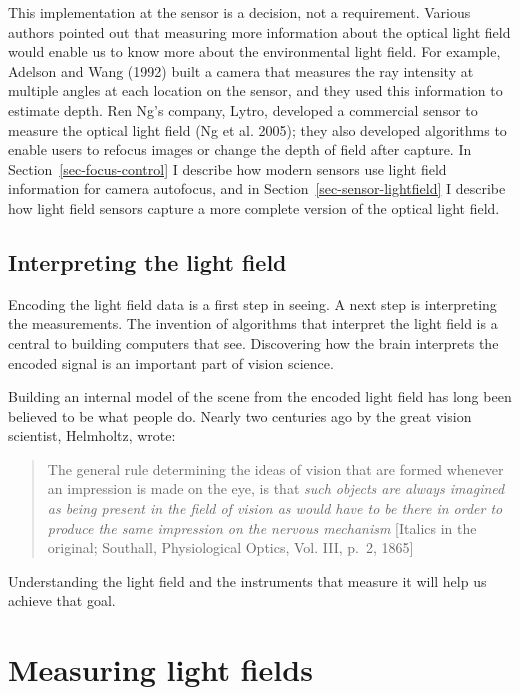 \documentclass[
  letterpaper,
]{book}
\begin{document}
This implementation at the sensor is a decision, not a requirement.
Various authors pointed out that measuring more information about the
optical light field would enable us to know more about the environmental
light field. For example, Adelson and Wang (1992) built a camera that
measures the ray intensity at multiple angles at each location on the
sensor, and they used this information to estimate depth. Ren Ng's
company, Lytro, developed a commercial sensor to measure the optical
light field (Ng et al. 2005); they also developed algorithms to enable
users to refocus images or change the depth of field after capture. In
Section~\ref{sec-focus-control} I describe how modern sensors use light
field information for camera autofocus, and in
Section~\ref{sec-sensor-lightfield} I describe how light field sensors
capture a more complete version of the optical light field.

\section{Interpreting the light
field}\label{interpreting-the-light-field}

Encoding the light field data is a first step in seeing. A next step is
interpreting the measurements. The invention of algorithms that
interpret the light field is a central to building computers that see.
Discovering how the brain interprets the encoded signal is an important
part of vision science.

Building an internal model of the scene from the encoded light field has
long been believed to be what people do. Nearly two centuries ago by the
great vision scientist, Helmholtz, wrote:

\begin{quote}
The general rule determining the ideas of vision that are formed
whenever an impression is made on the eye, is that \emph{such objects
are always imagined as being present in the field of vision as would
have to be there in order to produce the same impression on the nervous
mechanism} {[}Italics in the original; Southall, Physiological Optics,
Vol. III, p.~2, 1865{]}
\end{quote}

Understanding the light field and the instruments that measure it will
help us achieve that goal.

\chapter{Measuring light fields}\label{sec-lfmeasurement}
\end{document}
